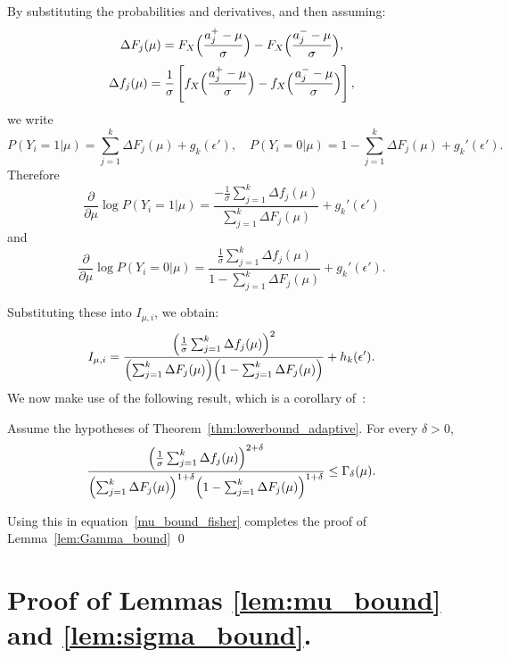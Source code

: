 \documentclass[10pt]{article} %
\def\eqref#1{equation~\ref{#1}}
\theoremstyle{plain}
\theoremstyle{definition}
\theoremstyle{remark}
\begin{document}
By substituting the probabilities and derivatives, and then assuming:
\[
\Delta F_j(\mu) 
= F_X\Bigl(\frac{a_j^+ - \mu}{\sigma}\Bigr) - F_X\Bigl(\frac{a_j^- - \mu}{\sigma}\Bigr),
\]
\[
\Delta f_j(\mu) 
=  \frac{1}{\sigma}\left[ f_X\Bigl(\frac{a_j^+ - \mu}{\sigma}\Bigr) - f_X\Bigl(\frac{a_j^- - \mu}{\sigma}\Bigr)\right],
\]
we write
\[
P(Y_i = 1 | \mu) = \sum_{j=1}^k \Delta F_j(\mu) +g_k(\epsilon'),
\quad
P(Y_i = 0 | \mu) = 1 - \sum_{j=1}^k \Delta F_j(\mu)+g_k'(\epsilon').
\]
Therefore
\[
\frac{\partial}{\partial \mu} \log P(Y_i = 1 | \mu) 
= \frac{-\frac{1}{\sigma} \sum_{j=1}^k \Delta f_j(\mu)}{\sum_{j=1}^k \Delta F_j(\mu)}+g_k'(\epsilon')
\]
and
\[
\frac{\partial}{\partial \mu} \log P(Y_i = 0 | \mu) 
= \frac{\frac{1}{\sigma} \sum_{j=1}^k \Delta f_j(\mu)}{1 - \sum_{j=1}^k \Delta F_j(\mu)}+g_k'(\epsilon').
\]

Substituting these into \( I_{\mu,i} \), we obtain:
\begin{equation}
I_{\mu,i}
= \frac{\Bigl(\frac{1}{\sigma} \sum_{j=1}^k \Delta f_j(\mu)\Bigr)^2}{
\Bigl(\sum_{j=1}^k \Delta F_j(\mu)\Bigr)\Bigl(1 - \sum_{j=1}^k \Delta F_j(\mu)\Bigr)}+h_k(\epsilon').
\label{mu_bound_fisher}
\end{equation}
We now make use of the following result, which is a corollary of~\cite[Lemma 11]{kipnis2022mean}:
\begin{lemma}
Assume the hypotheses of Theorem~\ref{thm:lowerbound_adaptive}. For every $\delta>0$,
\[
\frac{\Bigl(\frac{1}{\sigma} \sum_{j=1}^k \Delta f_j(\mu)\Bigr)^{2+\delta}}{
\Bigl(\sum_{j=1}^k \Delta F_j(\mu)\Bigr)^{1+\delta}\Bigl(1 - \sum_{j=1}^k \Delta F_j(\mu)\Bigr)^{1+\delta}} \leq \Gamma_\delta(\mu).
\]
\end{lemma}
Using this in \eqref{mu_bound_fisher} completes the proof of Lemma~\ref{lem:Gamma_bound} \qed

\section{Proof of  Lemmas \ref{lem:mu_bound} and \ref{lem:sigma_bound}.}\label{prf:lem:mu_sigma_bound}
\end{document}
